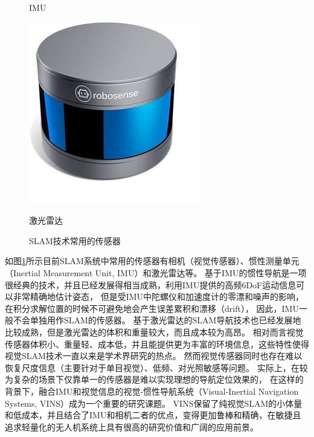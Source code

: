 \begin{figure}[htbp]
\begin{minipage}{0.32\textwidth}
    \caption[subfig:imu]{}{IMU}
    \end{minipage}
    \centering
    \begin{minipage}{0.32\textwidth}
    \centering
    \includegraphics[width=\textwidth]{figures/lidar.jpeg}
    \caption[subfig:lidar]{}{激光雷达}
    \end{minipage}
    \caption{SLAM技术常用的传感器}
    \label{fig:common_sensors_for_slam}
\end{figure}

如图\ref{fig:common_sensors_for_slam}所示目前SLAM系统中常用的传感器有相机（视觉传感器）、惯性测量单元（Inertial Measurement Unit, IMU）和激光雷达等。
基于IMU的惯性导航是一项很经典的技术，并且已经发展得相当成熟，利用IMU提供的高频6DoF运动信息可以非常精确地估计姿态，
但是受IMU中陀螺仪和加速度计的零漂和噪声的影响，在积分求解位置的时候不可避免地会产生误差累积和漂移（drift），
因此，IMU一般不会单独用作SLAM的传感器。
基于激光雷达的SLAM导航技术也已经发展地比较成熟，但是激光雷达的体积和重量较大，而且成本较为高昂。
相对而言视觉传感器体积小、重量轻、成本低，并且能提供更为丰富的环境信息，这些特性使得视觉SLAM技术一直以来是学术界研究的热点。
然而视觉传感器同时也存在难以恢复尺度信息（主要针对于单目视觉）、低频、对光照敏感等问题。
实际上，在较为复杂的场景下仅靠单一的传感器是难以实现理想的导航定位效果的，
在这样的背景下，融合IMU和视觉信息的视觉-惯性导航系统（Visual-Inertial Navigation Systems, VINS）成为一个重要的研究课题。
VINS保留了纯视觉SLAM的小体量和低成本，并且结合了IMU和相机二者的优点，变得更加鲁棒和精确，在敏捷且追求轻量化的无人机系统上具有很高的研究价值和广阔的应用前景。

